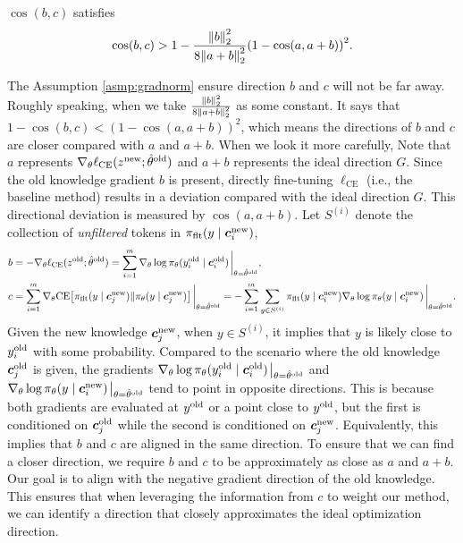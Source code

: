\begin{assumption}
\label{asmp:gradnorm}
$\cos(b, c)$ satisfies
\begin{equation}
\label{eq: cosbc bound}
\cos(b, c) > 1 - \frac{\norm{b}_2^2}{8 \norm{a + b}_2^2} 
\qty(1 - \cos(a, a + b))^2.
\end{equation}
\end{assumption}

\begin{remark}
    The Assumption \ref{asmp:gradnorm} ensure direction $b$ and $c$ will not be far away. Roughly speaking, when we take $\frac{\norm{b}_2^2}{8 \norm{a + b}_2^2}$ as some constant. It says that $1 - \cos(b, c) < (1 - \cos(a, a+b))^2$, which means the directions of $b$ and $c$ are closer compared with $a$ and $a+b$.
    When we look it more carefully, 
    Note that $a$ represents $\nabla_\theta \ell_{\text{CE}} (z^{\text{new}}; \hat{\theta}^{\text{old}})$ and $a + b$ represents the ideal direction $G$.
    Since the old knowledge gradient \( b \) is present, directly fine-tuning \( \ell_{\text{CE}} \) (i.e., the baseline method) results in a deviation compared with the ideal direction $G$. This directional deviation is measured by \( \cos(a, a + b) \). Let $S^{(i)}$ denote the collection of \textit{unfiltered} tokens in $\pi_\text{flt}(y \mid {\boldsymbol{c}}_i^{\text{new}})$,
   \begin{align}
    b & = - \nabla_\theta \ell_{\ce} (z^\old; \hat{\theta}^\old) = \sum_{i=1}^m \nabla_\theta \log \pil (y_i^\old \mid \cv_i^\old) \eval_{\theta = \hat{\theta}^\old},\\
    c & = \sum_{i =1}^m \nabla_\theta \ce \qty[ \pif(y \mid \cv_j^\new) \| \pi_\theta(y \mid \cv_j^\new) ] \eval_{\theta = \hat{\theta}^\old}
    = - \sum_{i =1}^m \sum_{y \in S^{(i)}} \pif(y \mid \cv_i^\new) \nabla_\theta \log \pi_\theta(y \mid \cv_i^\new) \eval_{\theta = \hat{\theta}^\old}. \label{eq: c detail}
    \end{align}
    Given the new knowledge ${\boldsymbol{c}}_j^{\text{new}}$, when $y \in S^{(i)}$, it implies that $y$ is likely close to $y_i^{\text{old}}$ with some probability. Compared to the scenario where the old knowledge ${\boldsymbol{c}}_j^{\text{old}}$ is given, the gradients $\nabla_\theta \log \pil (y_i^\old \mid \cv_i^\old) \eval_{\theta = \hat{\theta}^\old}$ and $\nabla_\theta \log \pi_\theta(y \mid \cv_i^\new) \eval_{\theta = \hat{\theta}^\old}$ tend to point in opposite directions. This is because both gradients are evaluated at $y^{\text{old}}$ or a point close to $y^{\text{old}}$, but the first is conditioned on ${\boldsymbol{c}}_j^{\text{old}}$ while the second is conditioned on ${\boldsymbol{c}}_j^{\text{new}}$. Equivalently, this implies that $b$ and $c$ are aligned in the same direction.
    To ensure that we can find a closer direction, we require $ b $ and $ c $ to be approximately as close as $ a $ and $ a + b $. Our goal is to align with the negative gradient direction of the old knowledge. This ensures that when leveraging the information from $ c $ to weight our method, we can identify a direction that closely approximates the ideal optimization direction.
\end{remark}

